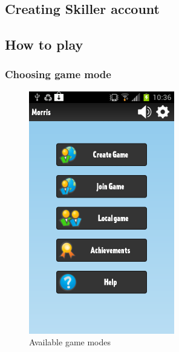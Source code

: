 \subsection{Creating Skiller account}

\subsection{How to play}
\label{section:playing}

\subsubsection{Choosing game mode}
\label{section:game_mode}
\begin{figure}[H]
\begin{center}
    \includegraphics[height=300pt]{Images/menuPage}
\end{center}
\caption{Available game modes}
\label{fig:gameMode}
\end{figure}


